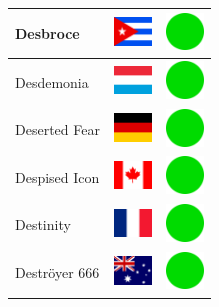 \documentclass[12pt, a4paper, twoside]{report}
\begin{document}
\begin{center}
\begin{longtable}{|p{5cm}|p{2cm}|p{2cm}|}
 Desbroce                                                   & \includegraphics[width=1cm]{../img/flags/cu} &   \includegraphics[width=1cm]{../likes/y} \\ \hline
 Desdemonia                                                 & \includegraphics[width=1cm]{../img/flags/lu} &   \includegraphics[width=1cm]{../likes/y} \\ \hline
 Deserted Fear                                              & \includegraphics[width=1cm]{../img/flags/de} &   \includegraphics[width=1cm]{../likes/y} \\ \hline
 Despised Icon                                              & \includegraphics[width=1cm]{../img/flags/ca} &   \includegraphics[width=1cm]{../likes/y} \\ \hline
 Destinity                                                  & \includegraphics[width=1cm]{../img/flags/fr} &   \includegraphics[width=1cm]{../likes/y} \\ \hline
 Deströyer 666                                              & \includegraphics[width=1cm]{../img/flags/au} &   \includegraphics[width=1cm]{../likes/y} \\ \hline

\end{longtable}
\end{center}
\end{document}
